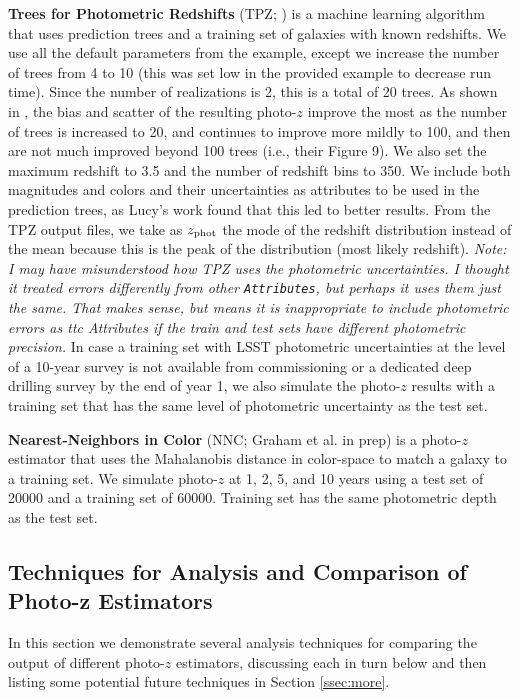 \documentclass[DM,lsstdraft,toc]{lsstdoc}
\begin{document}
{\bf Trees for Photometric Redshifts} (TPZ; \citealt{2013ascl.soft04011C,2013MNRAS.432.1483C}) is a machine learning algorithm that uses prediction trees and a training set of galaxies with known redshifts. We use all the default parameters from the example, except we increase the number of trees from 4 to 10 (this was set low in the provided example to decrease run time). Since the number of realizations is 2, this is a total of 20 trees. As shown in \cite{2013MNRAS.432.1483C}, the bias and scatter of the resulting photo-$z$ improve the most as the number of trees is increased to 20, and continues to improve more mildly to 100, and then are not much improved beyond 100 trees (i.e., their Figure 9). We also set the maximum redshift to 3.5 and the number of redshift bins to 350. We include both magnitudes and colors and their uncertainties as attributes to be used in the prediction trees, as Lucy's work found that this led to better results. From the TPZ output files, we take as $z_{\rm phot}$ the mode of the redshift distribution instead of the mean because this is the peak of the distribution (most likely redshift). {\it Note: I may have misunderstood how TPZ uses the photometric uncertainties. I thought it treated errors differently from other {\tt Attributes}, but perhaps it uses them just the same. That makes sense, but means it is inappropriate to include photometric errors as {ttc Attributes} if the train and test sets have different photometric precision.} In case a training set with LSST photometric uncertainties at the level of a 10-year survey is not available from commissioning or a dedicated deep drilling survey by the end of year 1, we also simulate the photo-$z$ results with a training set that has the same level of photometric uncertainty as the test set.

{\bf Nearest-Neighbors in Color} (NNC; Graham et al. in prep) is a photo-$z$ estimator that uses the Mahalanobis distance in color-space to match a galaxy to a training set. We simulate photo-$z$ at 1, 2, 5, and 10 years using a test set of 20000 and a training set of 60000. Training set has the same photometric depth as the test set. 


\subsection{Techniques for Analysis and Comparison of Photo-z Estimators}\label{ssec:comp}

In this section we demonstrate several analysis techniques for comparing the output of different photo-$z$ estimators, discussing each in turn below and then listing some potential future techniques in Section \ref{ssec:more}.
\end{document}
